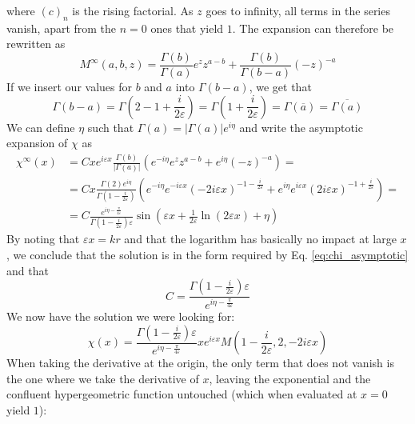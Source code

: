 where \((c)_n\) is the rising factorial. As \(z\) goes to infinity, all terms in the series vanish, apart from the \(n=0\) ones that yield \(1\). The expansion can therefore be rewritten as
\begin{equation}\label{eq:Mexpansion}
	M^{\infty} (a,b,z) =
	\frac{\Gamma (b)}{\Gamma (a)} e^z z^{a-b} +
	\frac{\Gamma (b)}{\Gamma (b-a)}(-z)^{-a}
\end{equation}
If we insert our values for \(b\) and \(a\) into \(\Gamma (b-a)\), we get that
\begin{equation}
	\Gamma (b-a) = \Gamma \left( 2- 1 + \frac{i}{2\varepsilon } \right) = \Gamma \left( 1+ \frac{i}{2 \varepsilon } \right) = \Gamma (\overline{a})= \overline{\Gamma (a)}
\end{equation}
We can define \(\eta \) such that \(\Gamma (a) = \vert \Gamma (a) \vert e^{i \eta } \) and write the asymptotic expansion of \(\chi \) as
\begin{align}
	\chi^{\infty}(x) &= Cxe^{i\varepsilon x} \frac{\Gamma (b)}{\vert \Gamma (a) \vert }
	\left( e^{-i \eta } e^z	z^{a-b} + e^{i \eta } (-z)^{-a}  \right) =\\
	&= C x \frac{\Gamma (2) e^{i \eta }}{\Gamma \left(1-\frac{i}{2\varepsilon }\right)}\left( e^{-i \eta } e^{-i\varepsilon x}(-2i\varepsilon x)^{-1-\frac{i}{2\varepsilon }} + e^{i \eta } e^{i \varepsilon x} (2i \varepsilon x)^{-1+ \frac{i}{2\varepsilon }} \right)=\\
	&=C \frac{e^{i \eta - \frac{\pi}{4 \varepsilon }}}{\Gamma \left( 1-\frac{i}{2\varepsilon } \right) \varepsilon } \sin \left( \varepsilon x + \frac{1}{2\varepsilon} \ln (2\varepsilon x) + \eta \right)
\end{align}
By noting that \(\varepsilon x= kr\) and that the logarithm has basically no impact at large \(x\), we conclude that the solution is in the form required by Eq. \eqref{eq:chi_asymptotic} and that
\begin{equation}
	C = \frac{\Gamma \left( 1- \frac{i}{2\varepsilon }\right) \varepsilon }{e^{i \eta - \frac{\pi}{4 \varepsilon }}}
\end{equation}
We now have the solution we were looking for:
\begin{equation}\label{eq:solution}
	\chi (x) = \frac{\Gamma \left(1-\frac{i}{2\varepsilon }\right) \varepsilon }{e^{i \eta - \frac{\pi}{4 \varepsilon }}}x e^{i\varepsilon x}M\left(1-\frac{i}{2\varepsilon },2,-2i \varepsilon x\right) 
\end{equation}
When taking the derivative at the origin, the only term that does not vanish is the one where we take the derivative of \(x \), leaving the exponential and the confluent hypergeometric function untouched (which when evaluated at \(x=0\) yield \(1\)):
